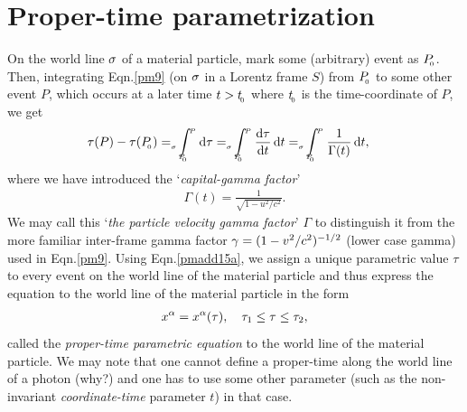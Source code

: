 \section{Proper-time parametrization}
On the world line ${\sigma}$ of a material particle, mark 
some 
(arbitrary) event as $P_{_{\hspace*{-1.5pt}{0}}}$. Then, integrating 
Eqn.\eqref{pm9} (on ${\sigma}$ in a Lorentz frame $S$) 
from 
$P_{_{\hspace*{-1.5pt}{0}}}$ to some other event $P$, which occurs at a 
later 
time $t > t_{_{\hspace*{-1.5pt}{0}}}$ where  $t_{_{\hspace*{-1.5pt}{0}}}$ is the 
time-coordinate of $P$, we get
\begin{align}\label{pmadd15a}
 \tau(P)- \tau(P_\sfx{0}) &=
 \pathint{\gks}_\sfx{\hsn P_\sfx{0}}^\sfx{P} \dd \tau
 =\pathint{\gks}_\sfx{\hsn P_\sfx{0}}^\sfx{P} 
\frac{\dd \tau}{\dd t}\,\dd t
=\pathint{\gks}_\sfx{\hsn 
P_\sfx{0}}^\sfx{P}\frac{1}{\Gamma(t)}\,\dd t,
\end{align}
where we have introduced the `\textsl{capital-gamma 
factor}' 
\begin{align}\label{pmadd16a}
\Gamma(t)=\frac{1}{\sqrt{1-u^2/c^2}}.
\end{align}
We may call this `\textsl{the  particle velocity gamma 
factor}' $\Gamma$ to distinguish it from the more 
familiar 
inter-frame gamma factor ${\gamma}=(1-v^2/c^2)^{-1/2}$ 
(lower case  gamma)  used in Eqn.\eqref{pm9}. Using 
Eqn.\eqref{pmadd15a},  we assign a unique parametric 
value 
$\tau $ to every event on the world line of the 
material 
particle and thus express the equation to the world 
line of 
the material particle in the form
\begin{align}\label{pmadd16}
x^{{\alpha}}=x^{{\alpha}}(\tau) ,\quad \tau_1\leq \tau\leq\tau_2,
\end{align}
called the \textsl{proper-time parametric equation} to 
the 
world line of the material particle. We may note that 
one 
cannot define a  proper-time along the world line of a 
photon ({why?}) and one has to use some other 
parameter 
(such as the non-invariant \textsl{coordinate-time} 
parameter $t$) in that case.

